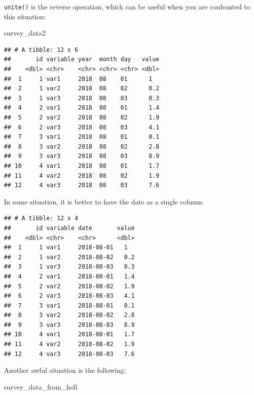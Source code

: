 \documentclass[]{gitbook}
\newenvironment{Shaded}{\begin{snugshade}}{\end{snugshade}}
\newcommand{\DataTypeTok}[1]{\textcolor[rgb]{0.13,0.29,0.53}{#1}}
\newcommand{\KeywordTok}[1]{\textcolor[rgb]{0.13,0.29,0.53}{\textbf{#1}}}
\newcommand{\NormalTok}[1]{#1}
\newcommand{\OperatorTok}[1]{\textcolor[rgb]{0.81,0.36,0.00}{\textbf{#1}}}
\newcommand{\StringTok}[1]{\textcolor[rgb]{0.31,0.60,0.02}{#1}}
\theoremstyle{definition}
\theoremstyle{definition}
\theoremstyle{definition}
\theoremstyle{remark}
\begin{document}
\texttt{unite()} is the reverse operation, which can be useful when you
are confronted to this situation:

\begin{Shaded}
\begin{Highlighting}[]
\NormalTok{survey_data2}
\end{Highlighting}
\end{Shaded}

\begin{verbatim}
## # A tibble: 12 x 6
##       id variable year  month day   value
##    <dbl> <chr>    <chr> <chr> <chr> <dbl>
##  1     1 var1     2018  08    01      1  
##  2     1 var2     2018  08    02      0.2
##  3     1 var3     2018  08    03      0.3
##  4     2 var1     2018  08    01      1.4
##  5     2 var2     2018  08    02      1.9
##  6     2 var3     2018  08    03      4.1
##  7     3 var1     2018  08    01      0.1
##  8     3 var2     2018  08    02      2.8
##  9     3 var3     2018  08    03      8.9
## 10     4 var1     2018  08    01      1.7
## 11     4 var2     2018  08    02      1.9
## 12     4 var3     2018  08    03      7.6
\end{verbatim}

In some situation, it is better to have the date as a single column:

\begin{Shaded}
\end{Shaded}

\begin{verbatim}
## # A tibble: 12 x 4
##       id variable date       value
##    <dbl> <chr>    <chr>      <dbl>
##  1     1 var1     2018-08-01   1  
##  2     1 var2     2018-08-02   0.2
##  3     1 var3     2018-08-03   0.3
##  4     2 var1     2018-08-01   1.4
##  5     2 var2     2018-08-02   1.9
##  6     2 var3     2018-08-03   4.1
##  7     3 var1     2018-08-01   0.1
##  8     3 var2     2018-08-02   2.8
##  9     3 var3     2018-08-03   8.9
## 10     4 var1     2018-08-01   1.7
## 11     4 var2     2018-08-02   1.9
## 12     4 var3     2018-08-03   7.6
\end{verbatim}

Another awful situation is the following:

\begin{Shaded}
\begin{Highlighting}[]
\NormalTok{survey_data_from_hell}
\end{Highlighting}
\end{Shaded}
\end{document}
